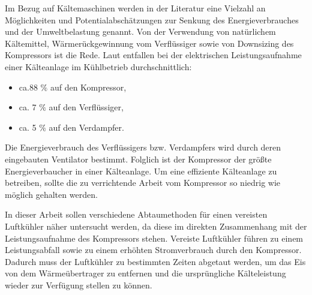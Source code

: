 



Im Bezug auf Kältemaschinen werden in der Literatur eine Vielzahl an Möglichkeiten und Potentialabschätzungen zur Senkung des Energieverbrauches und der Umweltbelastung genannt. Von der Verwendung von natürlichem Kältemittel, Wärmerückgewinnung vom Verflüssiger sowie von Downsizing des Kompressors ist die Rede. Laut \textsc{\citeauthor{EnergieAgenturNRW2010}} entfallen bei der elektrischen Leistungsaufnahme einer Kälteanlage im Kühlbetrieb durchschnittlich:

\begin{itemize}
	\item ca.88 $\%$ auf den Kompressor,
	\item ca. 7 $\%$ auf den Verflüssiger,
	\item ca. 5 $\%$ auf den Verdampfer.
\end{itemize}

Die Energieverbrauch des Verflüssigers bzw. Verdampfers wird durch deren eingebauten Ventilator bestimmt. 
Folglich ist der Kompressor der größte Energieverbaucher in einer Kälteanlage. Um eine effiziente Kälteanlage zu betreiben, sollte die zu verrichtende Arbeit vom Kompressor so niedrig wie möglich gehalten werden.

In dieser Arbeit sollen verschiedene Abtaumethoden für einen vereisten Luftkühler näher untersucht werden, da diese im direkten Zusammenhang mit der Leistungsaufnahme des Kompressors stehen. Vereiste Luftkühler führen zu einem Leistungsabfall sowie zu einem erhöhten Stromverbrauch durch den Kompressor. Dadurch muss der Luftkühler zu bestimmten Zeiten abgetaut werden, um das Eis von dem Wärmeübertrager zu entfernen und die ursprüngliche Kälteleistung wieder zur Verfügung stellen zu können. 



